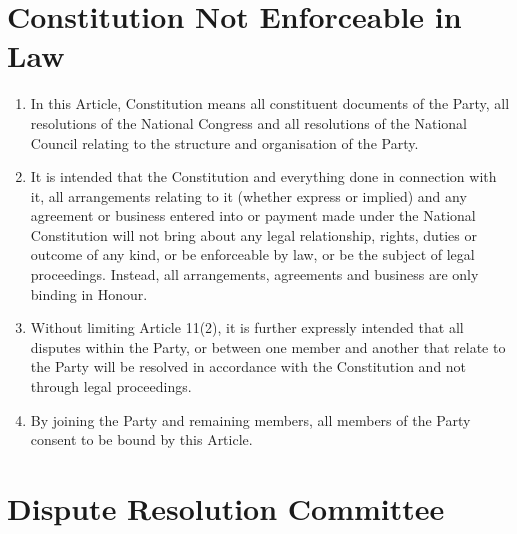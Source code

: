 \documentclass[a4paper,titlepage,8.5pt]{article}
\begin{document}
\section{Constitution Not Enforceable in Law}

\begin{enumerate}
\item In this Article, Constitution means all constituent documents of the Party, all resolutions of the National Congress and all resolutions of the National Council relating to the structure and organisation of the Party.
\item It is intended that the Constitution and everything done in connection with it, all arrangements relating to it (whether express or implied) and any agreement or business entered into or payment made under the National Constitution will not bring about any legal relationship, rights, duties or outcome of any kind, or be enforceable by law, or be the subject of legal proceedings. Instead, all arrangements, agreements and business are only binding in Honour.
\item Without limiting Article 11(2), it is further expressly intended that all disputes within the Party, or between one member and another that relate to the Party will be resolved in accordance with the Constitution and not through legal proceedings.
\item By joining the Party and remaining members, all members of the Party consent to be bound by this Article.
\end{enumerate}

\section{Dispute Resolution Committee}
\end{document}
